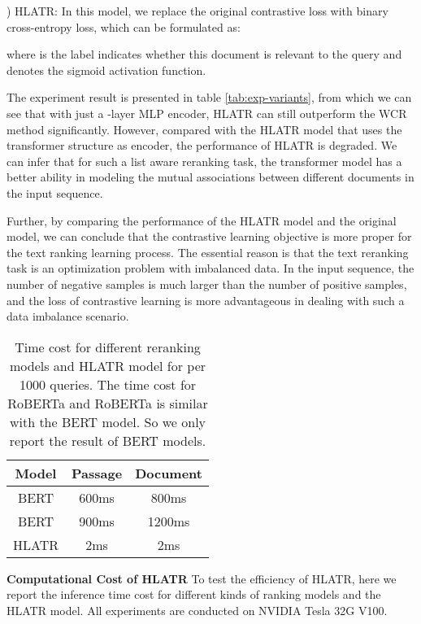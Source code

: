 \documentclass[11pt]{article}
\begin{document}
) HLATR: In this model, we replace the original contrastive loss with binary cross-entropy loss, which can be formulated as:

where  is the  label indicates whether this document is relevant to the query and  denotes the sigmoid activation function.

The experiment result is presented in table \ref{tab:exp-variants}, from which we can see that with just a -layer MLP encoder, HLATR can still outperform the WCR method significantly. However, compared with the HLATR model that uses the transformer structure as encoder, the performance of HLATR is degraded. We can infer that for such a list aware reranking task, the transformer model has a better ability in modeling the mutual associations between different documents in the input sequence.

Further, by comparing the performance of the HLATR model and the original model, we can conclude that the contrastive learning objective is more proper for the text ranking learning process. The essential reason is that the text reranking task is an optimization problem with imbalanced data. In the input sequence, the number of negative samples is much larger than the number of positive samples, and the loss of contrastive learning is more advantageous in dealing with such a data imbalance scenario.

\begin{table}[]
\centering
\caption{Time cost for different reranking models and HLATR model for per 1000 queries. The time cost for RoBERTa and RoBERTa is similar with the BERT model. So we only report the result of BERT models.}
\label{tab:time}
\begin{tabular}{c|c|c}
\toprule
Model      & Passage   & Document   \\ \midrule
BERT        & 600ms         & 800ms          \\ \midrule
BERT      & 900ms          & 1200ms         \\ \midrule
HLATR        & 2ms         & 2ms          \\ \bottomrule
\end{tabular}
\end{table}

\vspace{0.15cm}
\noindent \textbf{Computational Cost of HLATR} To test the efficiency of HLATR, here we report the inference time cost for different kinds of ranking models and the HLATR model. All experiments are conducted on NVIDIA Tesla 32G V100. 
\end{document}
